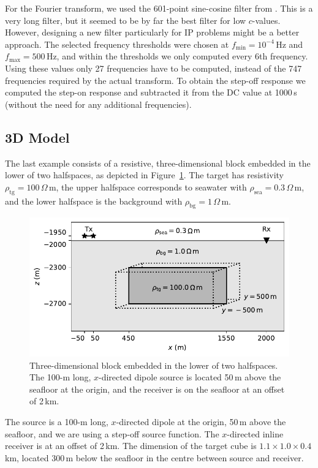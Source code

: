 \documentclass[extra, camera,%
]{gji}
\newlength{\cwidth}
\newcommand{\mr}[1]{\mathrm{#1}}
\newcommand{\ohmm}{\ensuremath{\Omega\,}\text{m}\xspace}
\begin{document}
For the Fourier transform, we used the 601-point sine-cosine filter from
\cite{GEO.09.Key}. This is a very long filter, but it seemed to be by far the
best filter for low $c$-values. However, designing a new filter particularly
for IP problems might be a better approach. The selected frequency thresholds
were chosen at $f_\mr{min}=10^{-4}\,$Hz and $f_\mr{max}=500\,$Hz, and within
the thresholds we only computed every 6th frequency. Using these values only 27
frequencies have to be computed, instead of the 747 frequencies required by the
actual transform. To obtain the step-off response we computed the step-on
response and subtracted it from the DC value at 1000\,s (without the need for
any additional frequencies).


\subsection{3D Model} %

The last example consists of a resistive, three-dimensional block embedded in
the lower of two halfspaces, as depicted in Figure~\ref{fig:3d-model}. The
target has resistivity $\rho_\mr{tg}=100\,\ohmm$, the upper halfspace
corresponds to seawater with $\rho_\mr{sea}=0.3\,\ohmm$, and the lower
halfspace is the background with $\rho_\mr{bg}=1\,\ohmm$.
%
\begin{figure}
  \centering
  \includegraphics[width=\cwidth]{09-3d-model}
  \caption{Three-dimensional block embedded in the lower of two halfspaces. The
    100-m long, $x$-directed dipole source is located 50\,m above the seafloor
    at the origin, and the receiver is on the seafloor at an offset of 2\,km.}
  \label{fig:3d-model}
\end{figure}
%
The source is a 100-m long, $x$-directed dipole at the origin, 50\,m above the
seafloor, and we are using a step-off source function. The $x$-directed inline
receiver is at an offset of 2\,km. The dimension of the target cube is
$1.1\times1.0\times0.4$\,km, located 300\,m below the seafloor in the centre
between source and receiver.
\end{document}
